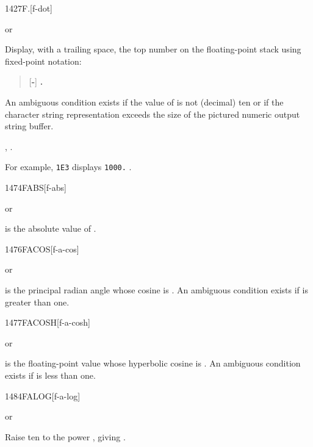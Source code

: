 \begin{worddef}[Fd]{1427}{F.}[f-dot]
\item \stack{}{}  or

	Display, with a trailing space, the top number on the
	floating-point stack using fixed-point notation:
	\begin{quote}
		[\textbf{-}] \textbf{.}
	\end{quote}
	An ambiguous condition exists if the value of 
	is not (decimal) ten or if the character string representation
	exceeds the size of the pictured numeric output string buffer.

\see {},
	.

	\begin{rationale} %
		For example, \texttt{1E3}  displays \texttt{1000.} .
	\end{rationale}
\end{worddef}


\begin{worddef}{1474}{FABS}[f-abs]
\item {} or

	 is the absolute value of .
\end{worddef}


\begin{worddef}{1476}{FACOS}[f-a-cos]
\item {} or

	 is the principal radian angle whose cosine is
	. An ambiguous condition exists if  is
	greater than one.
\end{worddef}


\begin{worddef}{1477}{FACOSH}[f-a-cosh]
\item {} or

	 is the floating-point value whose hyperbolic cosine is
	. An ambiguous condition exists if  is less
	than one.
\end{worddef}


\begin{worddef}{1484}{FALOG}[f-a-log]
\item {} or

	Raise ten to the power , giving .
\end{worddef}



